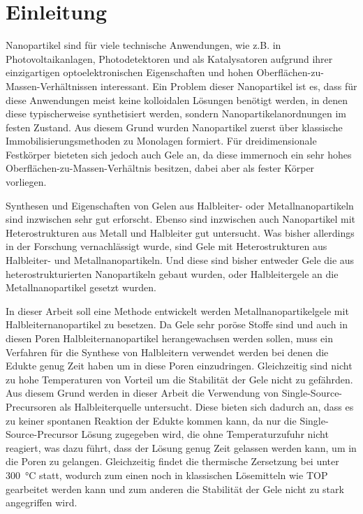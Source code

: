 \section{Einleitung}
Nanopartikel sind für viele technische Anwendungen, wie z.B. in Photovoltaikanlagen, Photodetektoren und als Katalysatoren aufgrund ihrer einzigartigen optoelektronischen Eigenschaften und hohen Oberflächen-zu-Massen-Verhältnissen interessant. 
\autocite{Afzaal2006,Cai2006,Law2005,Yan2003}
Ein Problem dieser Nanopartikel ist es, dass für diese Anwendungen meist keine kolloidalen Lösungen benötigt werden, in denen diese typischerweise synthetisiert werden, sondern Nanopartikelanordnungen im festen Zustand.
Aus diesem Grund wurden Nanopartikel zuerst über klassische Immobilisierungsmethoden zu Monolagen formiert.
Für dreidimensionale Festkörper bieteten sich jedoch auch Gele an, da diese immernoch ein sehr hohes Oberflächen-zu-Massen-Verhältnis besitzen, dabei aber als fester Körper vorliegen.

Synthesen und Eigenschaften von Gelen aus Halbleiter- oder Metallnanopartikeln sind inzwischen sehr gut erforscht.\autocite{Ziegler2017}
Ebenso sind inzwischen auch Nanopartikel mit Heterostrukturen aus Metall und Halbleiter gut untersucht.
Was bisher allerdings in der Forschung vernachlässigt wurde, sind Gele mit Heterostrukturen aus Halbleiter- und Metallnanopartikeln.
Und diese sind bisher entweder Gele die aus heterostrukturierten Nanopartikeln gebaut wurden,\autocite{Nahar2015,Lesnyak2011} oder Halbleitergele an die Metallnanopartikel gesetzt wurden. \autocite{Gill2009,Gill2011}

In dieser Arbeit soll eine Methode entwickelt werden Metallnanopartikelgele mit Halbleiternanopartikel zu besetzen.
Da Gele sehr poröse Stoffe sind und auch in diesen Poren Halbleiternanopartikel herangewachsen werden sollen, muss ein Verfahren für die Synthese von Halbleitern verwendet werden bei denen die Edukte genug Zeit haben um in diese Poren einzudringen.
Gleichzeitig sind nicht zu hohe Temperaturen von Vorteil um die Stabilität der Gele nicht zu gefährden.
Aus diesem Grund werden in dieser Arbeit die Verwendung von Single-Source-Precursoren als Halbleiterquelle untersucht.
Diese bieten sich dadurch an, dass es zu keiner spontanen Reaktion der Edukte kommen kann, da nur die Single-Source-Precursor Lösung zugegeben wird, die ohne Temperaturzufuhr nicht reagiert, was dazu führt, dass der Lösung genug Zeit gelassen werden kann, um in die Poren zu gelangen. 
Gleichzeitig findet die thermische Zersetzung bei unter \SI{300}{\degreeCelsius} statt, wodurch zum einen noch in klassischen Lösemitteln wie TOP gearbeitet werden kann und zum anderen die Stabilität der Gele nicht zu stark angegriffen wird.